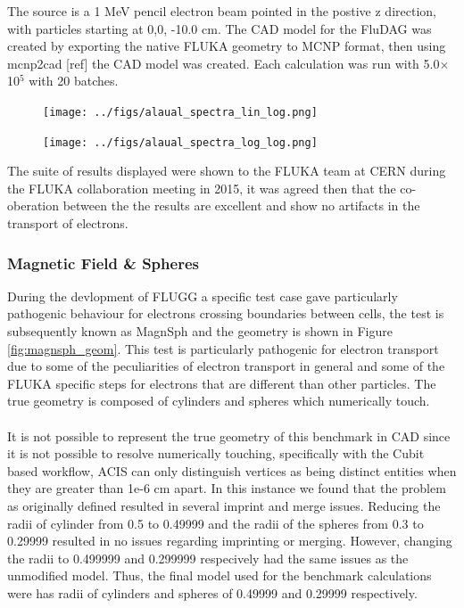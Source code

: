 The source is a 1 MeV pencil electron beam pointed in the postive z direction,
with particles starting at 0,0, -10.0 cm. The CAD model for the FluDAG was
created by exporting the native FLUKA geometry to MCNP format, then using
mcnp2cad [ref] the CAD model was created. Each calculation was run with
5.0$\times$10$^5$ with 20 batches.

\begin{figure}[ht!]
 \begin{centering}
 \centering
 \texttt{[image: ../figs/alaual\_spectra\_lin\_log.png]}
 \caption{}
 \label{fig:alaual_spectra_linlog}
 \end{centering}
\end{figure}

\begin{figure}[ht!]
 \begin{centering}
 \centering
 \texttt{[image: ../figs/alaual\_spectra\_log\_log.png]}
 \caption{}
 \label{fig:alaual_spectra_loglog}
 \end{centering}
\end{figure}

The suite of results displayed were shown to the FLUKA team at CERN during the
FLUKA collaboration meeting in 2015, it was agreed then that the co-oberation
between the the results are excellent and show no artifacts in the transport
of electrons. 

\clearpage
\subsubsection{Magnetic Field \& Spheres}
During the devlopment of FLUGG a specific test case gave particularly
pathogenic behaviour for electrons crossing boundaries between cells,
the test is subsequently known as MagnSph and the geometry is shown in Figure 
\ref{fig:magnsph_geom}. This test is particularly pathogenic for electron
transport due to some of the peculiarities of electron transport in general
and some of the FLUKA specific steps for electrons that are different than
other particles. The true geometry is composed of cylinders and spheres which
numerically touch. 
\\
\\
It is not possible to represent the true geometry of this benchmark in CAD
since it is not possible to resolve numerically touching, specifically with
the Cubit based workflow, ACIS can only distinguish vertices as being distinct
entities when they are greater than 1e-6 cm apart. In this instance we found
that the problem as originally defined resulted in several imprint and merge
issues. Reducing the radii of cylinder from 0.5 to 0.49999 and the radii of
the spheres from 0.3 to 0.29999 resulted in no issues regarding imprinting
or merging. However, changing the radii to 0.499999 and 0.299999 respecively
had the same issues as the unmodified model. Thus, the final model used for
the benchmark calculations were has radii of cylinders and spheres of
0.49999 and 0.29999 respectively.  

